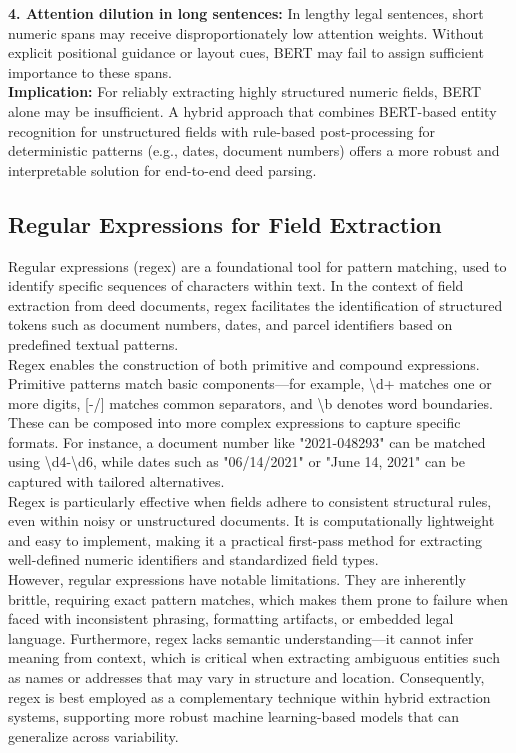 \documentclass{article}
\begin{document}
\textbf{4. Attention dilution in long sentences:} In lengthy legal sentences, short numeric spans may receive disproportionately low attention weights. Without explicit positional guidance or layout cues, BERT may fail to assign sufficient importance to these spans. \\

\textbf{Implication:} For reliably extracting highly structured numeric fields, BERT alone may be insufficient. A hybrid approach that combines BERT-based entity recognition for unstructured fields with rule-based post-processing for deterministic patterns (e.g., dates, document numbers) offers a more robust and interpretable solution for end-to-end deed parsing.

\subsection{Regular Expressions for Field Extraction}

Regular expressions (regex) are a foundational tool for pattern matching, used to identify specific sequences of characters within text. \cite{friedl2006regex} In the context of field extraction from deed documents, regex facilitates the identification of structured tokens such as document numbers, dates, and parcel identifiers based on predefined textual patterns. \\

Regex enables the construction of both primitive and compound expressions. Primitive patterns match basic components—for example, \textbackslash d+ matches one or more digits, [-/] matches common separators, and \textbackslash b denotes word boundaries. These can be composed into more complex expressions to capture specific formats. For instance, a document number like "2021-048293" can be matched using \textbackslash d{4}-\textbackslash d{6}, while dates such as "06/14/2021" or "June 14, 2021" can be captured with tailored alternatives. \\

Regex is particularly effective when fields adhere to consistent structural rules, even within noisy or unstructured documents. It is computationally lightweight and easy to implement, making it a practical first-pass method for extracting well-defined numeric identifiers and standardized field types. \\

However, regular expressions have notable limitations. They are inherently brittle, requiring exact pattern matches, which makes them prone to failure when faced with inconsistent phrasing, formatting artifacts, or embedded legal language. Furthermore, regex lacks semantic understanding—it cannot infer meaning from context, which is critical when extracting ambiguous entities such as names or addresses that may vary in structure and location. Consequently, regex is best employed as a complementary technique within hybrid extraction systems, supporting more robust machine learning-based models that can generalize across variability.
\end{document}
